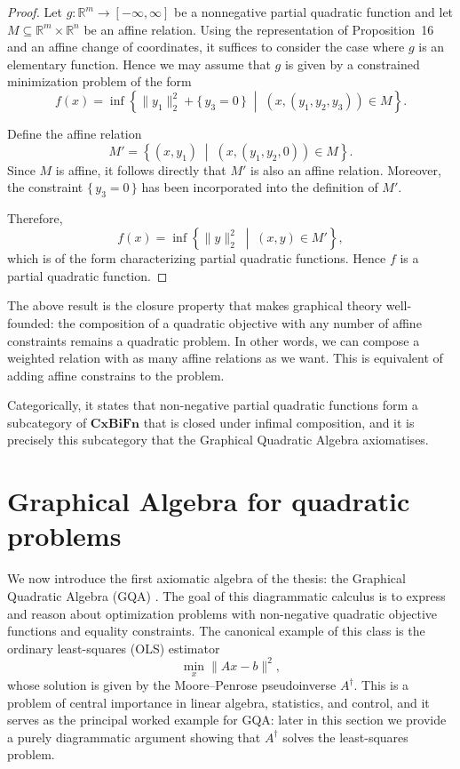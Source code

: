 \begin{proof}
Let $g:\mathbb{R}^m \to [-\infty,\infty]$ be a nonnegative partial quadratic
function and let $M \subseteq \mathbb{R}^m \times \mathbb{R}^n$ be an affine
relation. Using the representation of Proposition~16 and an affine change of
coordinates, it suffices to consider the case where $g$ is an elementary
function. Hence we may assume that $g$ is given by a constrained minimization
problem of the form
\[
f(x)
=
\inf \left\{
\|y_1\|_2^2 + \{\, y_3 = 0 \,\}
\;\middle|\;
(x,(y_1,y_2,y_3)) \in M
\right\}.
\]

Define the affine relation
\[
M'
=
\left\{
(x,y_1)
\;\middle|\;
(x,(y_1,y_2,0)) \in M
\right\}.
\]
Since $M$ is affine, it follows directly that $M'$ is also an affine
relation. Moreover, the constraint $\{\, y_3 = 0 \,\}$ has been incorporated
into the definition of $M'$.

Therefore,
\[
f(x)
=
\inf
\left\{
\|y\|_2^2
\;\middle|\;
(x,y) \in M'
\right\},
\]
which is of the form characterizing partial quadratic functions. Hence
$f$ is a partial quadratic function.

\end{proof}
The above result is the closure property that makes graphical theory well-founded: the composition of a quadratic objective with any number of  affine constraints remains a quadratic problem. In other words, we can compose a weighted relation with as many affine relations as we want. This is equivalent of adding affine constrains to the problem.

Categorically, it states  that non-negative partial quadratic functions form a subcategory of  $\mathbf{CxBiFn}$ that is closed under infimal composition, and it is  precisely this subcategory that the Graphical Quadratic Algebra axiomatises.

\section{Graphical Algebra for quadratic problems}\label{sec:gqa}

We now introduce the first axiomatic algebra of the thesis: the Graphical  Quadratic Algebra (GQA) \cite{stein2024gqa}. The goal of this diagrammatic  calculus is to express and reason about optimization problems with non-negative  quadratic objective functions and equality constraints. The canonical example  of this class is the ordinary least-squares (OLS) estimator
\[
\min_x \| Ax - b \|^2,
\]
whose solution is given by the Moore--Penrose pseudoinverse $A^\dagger$.  This is a problem of central importance in linear algebra, statistics, and  control, and it serves as the principal worked example for GQA: later in  this section we provide a purely diagrammatic argument showing that  $A^\dagger$ solves the least-squares problem.

